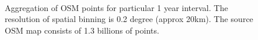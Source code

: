 \documentclass[a4paper,12pt,oneside]{report}
\begin{document}
		
		\begin{figure}[!h]
		  \centering
	
		  \\
			\label{figur}\caption{Aggregation of OSM points for particular 1 year interval. 
			The resolution of spatial binning is 0.2 degree (approx 20km). The source OSM map consists of 1.3 billions of points.
			}
			\label{fig:outmap}
		\end{figure}
	
\end{document}
